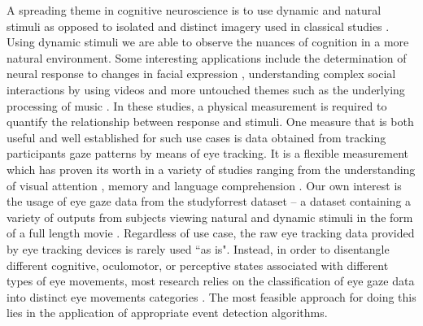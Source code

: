 A spreading theme in cognitive neuroscience is to use dynamic and natural stimuli as opposed to isolated and distinct
imagery used in classical studies \citep{real_world}. Using dynamic stimuli we are able to observe the nuances of
cognition in a more natural environment. Some interesting applications include the determination of neural response
to changes in facial expression \citep{Harris2014}, understanding complex social interactions by using videos
\citep{Tikka2012} and more untouched themes such as the underlying processing of music \citep{Toiviainen2014}.
In these studies, a physical measurement is required to quantify the relationship between response and stimuli.
One measure that is both useful and well established for such use cases is data obtained from tracking
participants gaze patterns by means of eye tracking. It is a flexible measurement which has proven its worth in a
variety of studies ranging from the understanding of visual attention \citep{HantaoLiu2011}, memory
\citep{Hannula2010} and language comprehension \citep{Gordon2006}. Our own interest is the usage of eye gaze data
from the studyforrest dataset -- a dataset containing a variety of outputs from subjects viewing natural and
dynamic stimuli in the form of a full length movie \citep{Hanke2016}.
Regardless of use case, the raw eye tracking data provided by eye tracking devices is rarely used ``as
is". Instead, in order to disentangle different cognitive, oculomotor, or perceptive states associated with
different types of eye movements, most research relies on the classification of eye gaze data into distinct eye
movements categories \citep{Schutz2011}. The most feasible approach for doing this lies in the application of
appropriate event detection algorithms.

